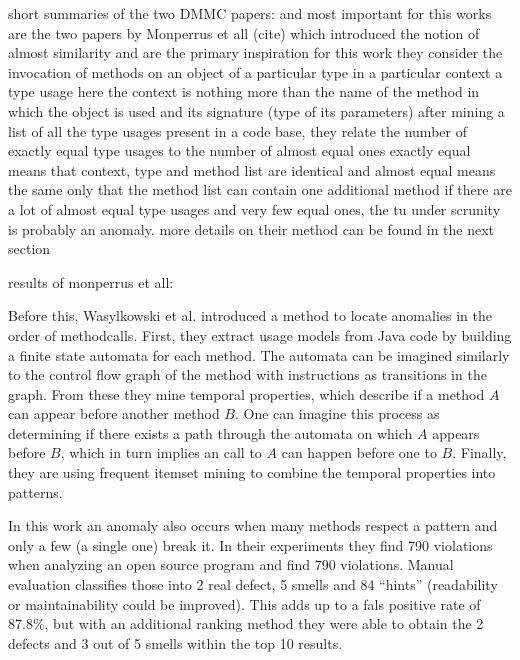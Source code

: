 short summaries of the two DMMC papers: \cite{monperrus2010detecting} and \cite{monperrus2013detecting}
most important for this works are the two papers by Monperrus et all (cite)
which introduced the notion of almost similarity and are the primary inspiration for this work
they consider the invocation of methods on an object of a particular type in a particular context a type usage
here the context is nothing more than the name of the method in which the object is used and its signature (type of its parameters)
after mining a list of all the type usages present in a code base, they relate the number of exactly equal type usages to the number of almost equal ones
exactly equal means that context, type and method list are identical and almost equal means the same only that the method list can contain one additional method
if there are a lot of almost equal type usages and very few equal ones, the tu under scrunity is probably an anomaly.
more details on their method can be found in the next section

results of monperrus et all:

Before this, Wasylkowski et al. \cite{wasylkowski2007detecting} introduced a method to locate anomalies in the order of methodcalls.
First, they extract usage models from Java code by building a finite state automata for each method.
The automata can be imagined similarly to the control flow graph of the method with instructions as transitions in the graph.
From these they mine temporal properties, which describe if a method $A$ can appear before another method $B$.
One can imagine this process as determining if there exists a path through the automata on which $A$ appears before $B$, which in turn implies an call to $A$ can happen before one to $B$.
Finally, they are using frequent itemset mining \cite{han2006data} to combine the temporal properties into patterns.

In this work an anomaly also occurs when many methods respect a pattern and only a few (a single one) break it.
In their experiments they find 790 violations when analyzing an open source program and find 790 violations.
Manual evaluation classifies those into 2 real defect, 5 smells and 84 ``hints'' (readability or maintainability could be improved).
This adds up to a fals positive rate of 87.8\%, but with an additional ranking method they were able to obtain the 2 defects and 3 out of 5 smells within the top 10 results.

